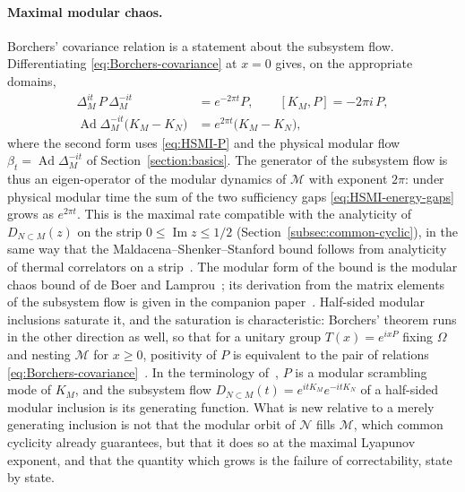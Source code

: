 \documentclass[a4paper,11pt]{article}
\theoremstyle{definition}
\newcommand{\nn}{\nonumber}
\begin{document}
\paragraph{Maximal modular chaos.}
Borchers' covariance relation is a statement about the subsystem flow. Differentiating \eqref{eq:Borchers-covariance} at $x=0$ gives, on the appropriate domains,
\begin{align}
 \Delta_M^{it}\,P\,\Delta_M^{-it}&=e^{-2\pi t}P,\qquad [K_M,P]=-2\pi i\,P,\nn\\
 \operatorname{Ad}\Delta_M^{-it}\bigl(K_M-K_N\bigr)&=e^{2\pi t}\bigl(K_M-K_N\bigr),
 \label{eq:modular-Lyapunov}
\end{align}
where the second form uses \eqref{eq:HSMI-P} and the physical modular flow $\beta_t=\operatorname{Ad}\Delta_M^{-it}$ of Section~\ref{section:basics}. The generator of the subsystem flow is thus an eigen-operator of the modular dynamics of $\mathcal M$ with exponent $2\pi$: under physical modular time the sum of the two sufficiency gaps \eqref{eq:HSMI-energy-gaps} grows as $e^{2\pi t}$. This is the maximal rate compatible with the analyticity of $D_{N\subset M}(z)$ on the strip $0\le\operatorname{Im}z\le1/2$ (Section~\ref{subsec:common-cyclic}), in the same way that the Maldacena--Shenker--Stanford bound follows from analyticity of thermal correlators on a strip~\cite{MSS2016}. The modular form of the bound is the modular chaos bound of de Boer and Lamprou~\cite{deBoerLamprou2020}; its derivation from the matrix elements of the subsystem flow is given in the companion paper~\cite{companionQFT}. Half-sided modular inclusions saturate it, and the saturation is characteristic: Borchers' theorem runs in the other direction as well, so that for a unitary group $T(x)=e^{ixP}$ fixing $\Omega$ and nesting $\mathcal M$ for $x\ge0$, positivity of $P$ is equivalent to the pair of relations \eqref{eq:Borchers-covariance}~\cite{revolutionizing}. In the terminology of~\cite{deBoerLamprou2020}, $P$ is a modular scrambling mode of $K_M$, and the subsystem flow $D_{N\subset M}(t)=e^{itK_M}e^{-itK_N}$ of a half-sided modular inclusion is its generating function. What is new relative to a merely generating inclusion is not that the modular orbit of $\mathcal N$ fills $\mathcal M$, which common cyclicity already guarantees, but that it does so at the maximal Lyapunov exponent, and that the quantity which grows is the failure of correctability, state by state.
\end{document}
